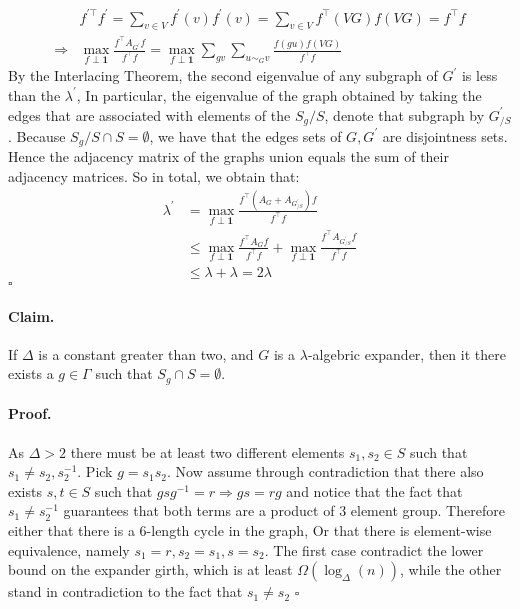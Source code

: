\documentclass{article}
\begin{document}
\begin{multicols*}{2}
  \begin{equation*}
    \begin{split}
     &  f^{\prime \top}f^{\prime}   = \sum_{v \in V}f^{\prime}\left( v \right)f^{\prime}\left( v \right)   =   \sum_{v \in V } f^{\top}\left( VG \right)f\left( VG \right) = f^{\top}f \\
     \Rightarrow  &  \max_{f \perp \mathbf{1}} { \frac{f^{\top}A_{G^{\prime}} f  }{ f^{\top}f}} =\max_{f \perp \mathbf{1}} { \sum_{gv}\sum_{ u\sim_{G} v }\frac{f\left( gu \right) f \left( VG \right)  }{ f^{\top}f}} 
    \end{split}
  \end{equation*}
  By the Interlacing Theorem, \cite{HAEMERS1995593} the second eigenvalue of any subgraph of $G^{\prime}$ is less than the $\lambda^{\prime}$, In particular, the eigenvalue of the graph obtained by taking the edges that are associated with elements of the $ S_{g} / S $, denote that subgraph by $G^{\prime}_{ / S}$. Because $S_{g} / S \cap S = \emptyset $, we have that the edges sets of $G, G^{\prime}$ are disjointness sets. Hence the adjacency matrix of the graphs union equals the sum of their adjacency matrices. So in total, we obtain that:  
    \begin{equation*}
    \begin{split}
      \lambda^{\prime} &= \max_{f \perp \mathbf{1}} { \frac{f^{\top} \left( A_{G} + A_{G^{\prime}_{/S}} \right) f  }{ f^{\top}f}} \\
      & \le  \max_{f \perp \mathbf{1}} { \frac{f^{\top}A_{G} f  }{ f^{\top}f}} +  \max_{f \perp \mathbf{1}} { \frac{f^{\top}A_{G^{\prime}_{/S}} f  }{ f^{\top}f}} \\
      & \le \lambda + \lambda = 2\lambda
    \end{split}
  \end{equation*} 
  $\square$ 
  \paragraph{Claim.} If $\Delta$ is a constant greater than two, and $G$ is a $\lambda$-algebric expander, then it there exists a $g \in \Gamma$ such that $S_{g}\cap S = \emptyset$.  
  \paragraph{Proof.} As $\Delta > 2 $ there must be at least two different elements $s_{1},s_{2} \in S$  such that $s_{1} \neq s_{2}, s_{2}^{-1}$. Pick $g = s_{1}s_{2}$. Now assume through contradiction that there also exists $s,t \in S$ such that $gsg^{-1} = r \Rightarrow gs = rg$ and notice that the fact that $s_{1}\neq s_{2}^{-1}$ guarantees that both terms are a product of $3$ element group. Therefore either that there is a $6$-length cycle in the graph, Or that there is element-wise equivalence, namely $s_{1} = r, s_{2} = s_{1}, s=s_{2}$. The first case contradict the lower bound on the expander girth, which is at least $\Omega \left( \log_{\Delta}(n) \right)$, while the other stand in contradiction to the fact that $s_{1} \neq s_{2}$ $\square$  

\end{multicols*}
\end{document}
